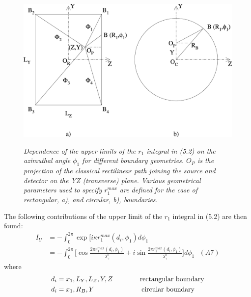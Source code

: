 \documentclass [12pt]{article}
\begin{document}
{ \begin{figure}[htbp]
\begin{center}
\hspace*{-0.5cm}\mbox{
\includegraphics[width=5.5in]{poptf12c.eps}}
\caption{{\sl  Dependence of the upper limits of the $r_1$ integral in (5.2)
   on the azimuthal angle $\phi_1$ for different
   boundary geometries. $O_P$ is the projection of the classical rectilinear path joining the source 
   and detector on the YZ (transverse) plane. Various geometrical parameters used to specify
    $r_1^{max}$ are defined for the case of rectangular, a), and circular, b), boundaries.  }} 
\label{fig-fig12}
\end{center}
\end{figure}
  
 \par    The following contributions of the upper limit of the $r_1$ integral in (5.2) are then 
    found:
 \begin{align*}
  I_U &= -\int_0^{2 \pi} \exp[i\kappa r_1^{max}(d_i, \phi_1) d \phi_1 \\
   &=  -\int_0^{2 \pi}\bigl[ \cos\frac{2 \pi  r_1^{max}(d_i, \phi_1)}{\lambda_{\gamma}^0} +
  i\sin \frac{2 \pi  r_1^{max}(d_i, \phi_1)}{\lambda_{\gamma}^0}\bigr] d \phi_1 ~~~(A7)
\end{align*}
  where
   \begin{align*}
d_i &= x_1, L_Y, L_Z, Y, Z \qquad\qquad {\rm rectangular~boundary} \\
d_i &= x_1, R_B, Y\phantom{,L_Z, Z} \qquad\qquad{\rm circular~boundary}
\end{align*}

}
\end{document}

